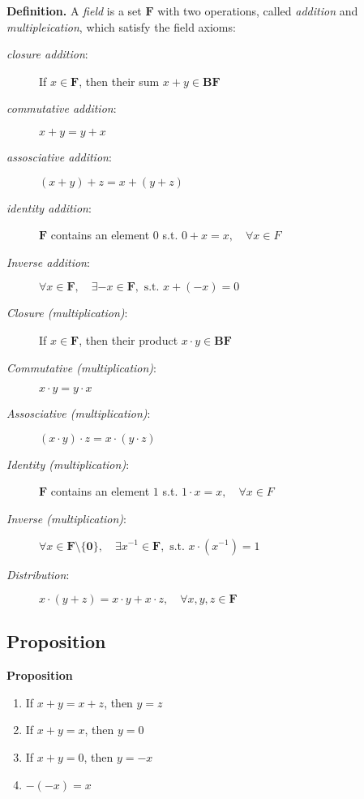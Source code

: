 \documentclass{article}
\begin{document}
{\bf Definition.}
	A \emph{field} is a set $\mathbf{F}$ with two operations, called \emph{addition} and \emph{multipleication}, which satisfy the field axioms:
	\begin{description}
		\item[\emph{closure addition}:]
			If $x \in \mathbf{F}$, then their sum $x + y \in \mathbf{BF}$
		\item[\emph{commutative addition}:]
			$x + y = y + x$
		\item[\emph{assosciative addition}:]
			$(x + y) + z = x + (y + z)$
		\item[\emph{identity addition}:]
			$\mathbf{F}$ contains an element $0$ s.t. $0 + x = x, \quad \forall x\in F$
		\item[\emph{Inverse addition}:]
			$\forall x \in \mathbf{F}, \quad \exists -x \in \mathbf{F}, \text{ s.t. } x + (-x) = 0$
		\item[\emph{Closure (multiplication)}:]
			If $x \in \mathbf{F}$, then their product $x \cdot y \in \mathbf{BF}$
		\item[\emph{Commutative (multiplication)}:]
			$x \cdot y = y \cdot x$
		\item[\emph{Assosciative (multiplication)}:]
			$(x \cdot y) \cdot z = x \cdot (y \cdot z)$
		\item[\emph{Identity (multiplication)}:]
			$\mathbf{F}$ contains an element $1$ s.t. $1 \cdot x = x, \quad \forall x\in F$
		\item[\emph{Inverse (multiplication)}:]
			$\forall x \in \mathbf{F\setminus\{0\}}, \quad \exists x^{-1} \in \mathbf{F}, \text{ s.t. } x \cdot (x^{-1}) = 1$
		\item[\emph{Distribution}:]
			$x \cdot (y + z) = x \cdot y + x \cdot z, \quad \forall x, y, z \in \mathbf{F}$
			
	\end{description}


\subsection{Proposition}

{\noindent\bf Proposition}

\begin{enumerate}
	\item If $x + y = x + z$, then $y = z$
	\item If $x + y = x$, then $y = 0$
	\item If $x + y = 0$, then $y = -x$
	\item $-(-x) = x$
\end{enumerate}
\end{document}
